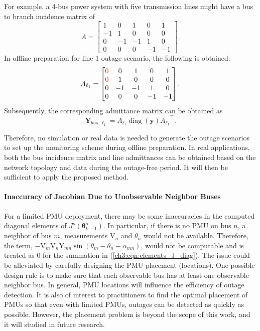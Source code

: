 For example, a 4-bus power system with five transmission lines might have a bus to branch incidence matrix of \[ {A} = \begin{bmatrix}
1   &   0   &   1   &   0   &   1 \\
-1  &   1   &   0   &   0   &   0 \\
0   &   -1  &   -1  &   1   &   0 \\
0   &   0   &   0   &   -1  &   -1
\end{bmatrix} .\]
In offline preparation for line 1 outage scenario, the following is obtained:
\[ {A}_{\ell_1} = \begin{bmatrix}
\color{red} 0   &   0   &   1   &   0   &   1 \\
\color{red} 0   &   1   &   0   &   0   &   0 \\
0   &   -1  &   -1  &   1   &   0 \\
0   &   0   &   0   &   -1  &   -1
\end{bmatrix} .\] Subsequently, the corresponding admittance matrix can be obtained as $$\boldsymbol{Y}_{bus, \ell_1} = {A_{\ell_1} \operatorname{diag}(\mathbf{y}) A_{\ell_1}}^{\top}.$$

Therefore, no simulation or real data is needed to generate the outage scenarios to set up the monitoring scheme during offline preparation. In real applications, both the bus incidence matrix and line admittances can be obtained based on the network topology and data during the outage-free period. It will then be sufficient to apply the proposed method.

\paragraph{Inaccuracy of Jacobian Due to Unobservable Neighbor Buses}
For a limited PMU deployment, there may be some inaccuracies in the computed diagonal elements of ${J}^o(\boldsymbol{\theta}^o_{k-1})$. In particular, if there is no PMU on bus $n$, a neighbor of bus $m$, measurements $\text{V}_{n}$ and $\theta_{n}$ would not be available. Therefore, the term, $-\text{V}_{m} \text{V}_{n} \text{Y}_{m n} \sin \left(\theta_{m}-\theta_{n}-\alpha_{m n}\right)$, would not be computable and is treated as 0 for the summation in (\ref{ch3:eqn:elements_J_diag}). The issue could be alleviated by carefully designing the PMU placement (locations). One possible design rule is to make sure that each observable bus has at least one observable neighbor bus. In general, PMU locations will influence the efficiency of outage detection. It is also of interest to practitioners to find the optimal placement of PMUs so that even with limited PMUs, outages can be detected as quickly as possible. However, the placement problem is beyond the scope of this work, and it will studied in future research. 

